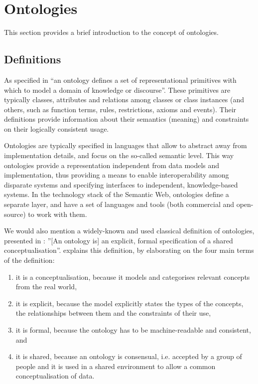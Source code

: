 \section{Ontologies}
\label{sec:ontologies}
This section provides a brief introduction to the concept of ontologies.

\subsection{Definitions}
As specified in \cite{gruber2008ontology} {\textquotedblleft}an ontology defines a
set of representational primitives with which to model a domain of
knowledge or discourse{\textquotedblright}. These primitives are
typically classes, attributes and relations among classes or class
instances (and others, such as function terms, rules, restrictions,
axioms and events). Their definitions provide information about their
semantics (meaning) and constraints on their logically consistent
usage. 

Ontologies are typically specified in languages that allow to abstract
away from implementation details, and focus on the so-called semantic
level. This way ontologies provide a representation independent from
data models and implementation, thus providing a means to enable
interoperability among disparate systems and specifying interfaces to
independent, knowledge-based systems. In the technology stack of the
Semantic Web, ontologies define a separate layer, and have a set of
languages and tools (both commercial and open-source) to work with
them. 

We would also mention a widely-known and used classical definition of
ontologies, presented in \cite{gruber93towards}: {\textquotedblright}[An
ontology is] an explicit, formal specification of a shared
conceptualisation{\textquotedblright}. \cite{studer1998knowledge_engineering_principles} explains
this definition, by elaborating on the four main terms of the
definition:

\begin{enumerate}
\item it is a conceptualisation, because it models and categorises
relevant concepts from the real world, 
\item it is explicit, because the model explicitly states the types of
the concepts, the relationships between them and the constraints of
their use, 
\item it is formal, because the ontology has to be machine-readable and
consistent, and 
\item it is shared, because an ontology is consensual, i.e. accepted by
a group of people and it is used in a shared environment to allow a
common conceptualisation of data. 
\end{enumerate}

